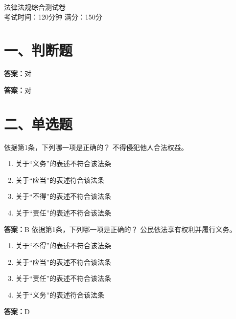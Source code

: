 \documentclass[12pt]{ctexart}
\begin{document}
\vspace*{-2em}
\begin{center}
  {\LARGE 法律法规综合测试卷}\\[4pt]
  考试时间：120分钟 \quad 满分：150分
\end{center}
\vspace{0.5em}

\section*{一、判断题}
\begin{questions}
\question {}\ifprintanswers\par\textbf{答案：}对\fi
\question {}\ifprintanswers\par\textbf{答案：}对\fi
\end{questions}
\section*{二、单选题}
\begin{questions}
\question 依据第1条，下列哪一项是正确的？
不得侵犯他人合法权益。
\begin{enumerate}[label=\Alph*.]
\item 关于“义务”的表述不符合该法条
\item 关于“应当”的表述符合该法条
\item 关于“不得”的表述不符合该法条
\item 关于“责任”的表述不符合该法条
\end{enumerate}
\ifprintanswers\par\textbf{答案：}B\fi
\question 依据第1条，下列哪一项是正确的？
公民依法享有权利并履行义务。
\begin{enumerate}[label=\Alph*.]
\item 关于“不得”的表述不符合该法条
\item 关于“应当”的表述不符合该法条
\item 关于“责任”的表述不符合该法条
\item 关于“义务”的表述符合该法条
\end{enumerate}
\ifprintanswers\par\textbf{答案：}D\fi
\end{questions}
\end{document}
